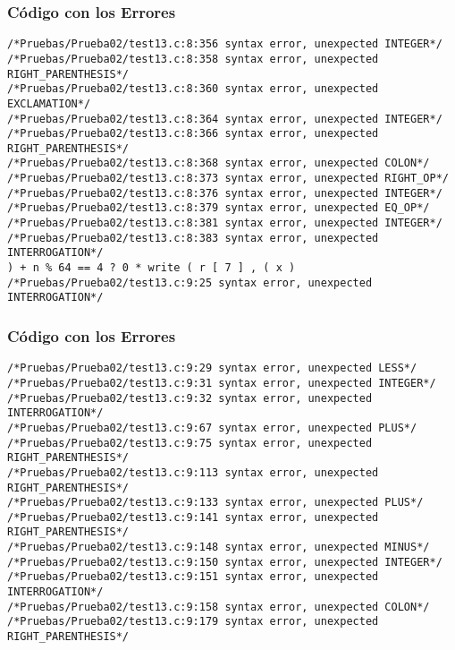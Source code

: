\documentclass{beamer}
\begin{document}
\begin{frame}[fragile]
\frametitle{C\'odigo con los Errores}
\begin{verbatim}
/*Pruebas/Prueba02/test13.c:8:356 syntax error, unexpected INTEGER*/
/*Pruebas/Prueba02/test13.c:8:358 syntax error, unexpected RIGHT_PARENTHESIS*/
/*Pruebas/Prueba02/test13.c:8:360 syntax error, unexpected EXCLAMATION*/
/*Pruebas/Prueba02/test13.c:8:364 syntax error, unexpected INTEGER*/
/*Pruebas/Prueba02/test13.c:8:366 syntax error, unexpected RIGHT_PARENTHESIS*/
/*Pruebas/Prueba02/test13.c:8:368 syntax error, unexpected COLON*/
/*Pruebas/Prueba02/test13.c:8:373 syntax error, unexpected RIGHT_OP*/
/*Pruebas/Prueba02/test13.c:8:376 syntax error, unexpected INTEGER*/
/*Pruebas/Prueba02/test13.c:8:379 syntax error, unexpected EQ_OP*/
/*Pruebas/Prueba02/test13.c:8:381 syntax error, unexpected INTEGER*/
/*Pruebas/Prueba02/test13.c:8:383 syntax error, unexpected INTERROGATION*/
) + n % 64 == 4 ? 0 * write ( r [ 7 ] , ( x ) 
/*Pruebas/Prueba02/test13.c:9:25 syntax error, unexpected INTERROGATION*/
\end{verbatim}
\end{frame}
\begin{frame}[fragile]
\frametitle{C\'odigo con los Errores}
\begin{verbatim}
/*Pruebas/Prueba02/test13.c:9:29 syntax error, unexpected LESS*/
/*Pruebas/Prueba02/test13.c:9:31 syntax error, unexpected INTEGER*/
/*Pruebas/Prueba02/test13.c:9:32 syntax error, unexpected INTERROGATION*/
/*Pruebas/Prueba02/test13.c:9:67 syntax error, unexpected PLUS*/
/*Pruebas/Prueba02/test13.c:9:75 syntax error, unexpected RIGHT_PARENTHESIS*/
/*Pruebas/Prueba02/test13.c:9:113 syntax error, unexpected RIGHT_PARENTHESIS*/
/*Pruebas/Prueba02/test13.c:9:133 syntax error, unexpected PLUS*/
/*Pruebas/Prueba02/test13.c:9:141 syntax error, unexpected RIGHT_PARENTHESIS*/
/*Pruebas/Prueba02/test13.c:9:148 syntax error, unexpected MINUS*/
/*Pruebas/Prueba02/test13.c:9:150 syntax error, unexpected INTEGER*/
/*Pruebas/Prueba02/test13.c:9:151 syntax error, unexpected INTERROGATION*/
/*Pruebas/Prueba02/test13.c:9:158 syntax error, unexpected COLON*/
/*Pruebas/Prueba02/test13.c:9:179 syntax error, unexpected RIGHT_PARENTHESIS*/
\end{verbatim}
\end{frame}
\end{document}
